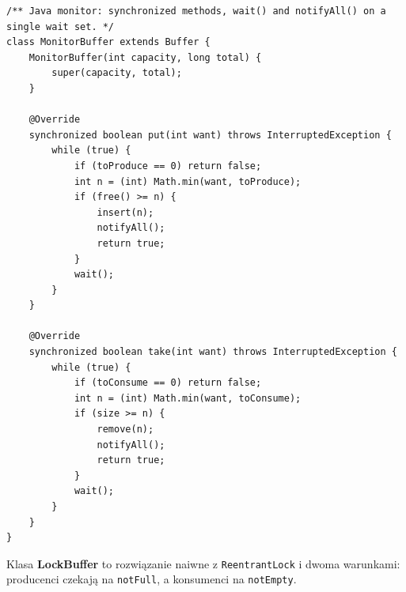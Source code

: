 \documentclass[11pt,a4paper]{article}
\begin{document}
\begin{lstlisting}[caption={Klasa \textbf{MonitorBuffer} (\texttt{src/MonitorBuffer.java})}]
/** Java monitor: synchronized methods, wait() and notifyAll() on a single wait set. */
class MonitorBuffer extends Buffer {
    MonitorBuffer(int capacity, long total) {
        super(capacity, total);
    }

    @Override
    synchronized boolean put(int want) throws InterruptedException {
        while (true) {
            if (toProduce == 0) return false;
            int n = (int) Math.min(want, toProduce);
            if (free() >= n) {
                insert(n);
                notifyAll();
                return true;
            }
            wait();
        }
    }

    @Override
    synchronized boolean take(int want) throws InterruptedException {
        while (true) {
            if (toConsume == 0) return false;
            int n = (int) Math.min(want, toConsume);
            if (size >= n) {
                remove(n);
                notifyAll();
                return true;
            }
            wait();
        }
    }
}
\end{lstlisting}

Klasa \textbf{LockBuffer} to rozwiązanie naiwne z \texttt{ReentrantLock} i dwoma warunkami: producenci czekają na \texttt{notFull}, a konsumenci na \texttt{notEmpty}.
\end{document}
